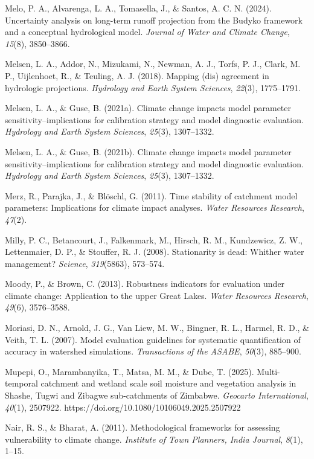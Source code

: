 \documentclass[
]{article}
\begin{document}
Melo, P. A., Alvarenga, L. A., Tomasella, J., \& Santos, A. C. N.
(2024). Uncertainty analysis on long-term runoff projection from the
Budyko framework and a conceptual hydrological model. \emph{Journal of
Water and Climate Change}, \emph{15}(8), 3850--3866.

Melsen, L. A., Addor, N., Mizukami, N., Newman, A. J., Torfs, P. J.,
Clark, M. P., Uijlenhoet, R., \& Teuling, A. J. (2018). Mapping (dis)
agreement in hydrologic projections. \emph{Hydrology and Earth System
Sciences}, \emph{22}(3), 1775--1791.

Melsen, L. A., \& Guse, B. (2021a). Climate change impacts model
parameter sensitivity--implications for calibration strategy and model
diagnostic evaluation. \emph{Hydrology and Earth System Sciences},
\emph{25}(3), 1307--1332.

Melsen, L. A., \& Guse, B. (2021b). Climate change impacts model
parameter sensitivity--implications for calibration strategy and model
diagnostic evaluation. \emph{Hydrology and Earth System Sciences},
\emph{25}(3), 1307--1332.

Merz, R., Parajka, J., \& Blöschl, G. (2011). Time stability of
catchment model parameters: Implications for climate impact analyses.
\emph{Water Resources Research}, \emph{47}(2).

Milly, P. C., Betancourt, J., Falkenmark, M., Hirsch, R. M., Kundzewicz,
Z. W., Lettenmaier, D. P., \& Stouffer, R. J. (2008). Stationarity is
dead: Whither water management? \emph{Science}, \emph{319}(5863),
573--574.

Moody, P., \& Brown, C. (2013). Robustness indicators for evaluation
under climate change: Application to the upper Great Lakes. \emph{Water
Resources Research}, \emph{49}(6), 3576--3588.

Moriasi, D. N., Arnold, J. G., Van Liew, M. W., Bingner, R. L., Harmel,
R. D., \& Veith, T. L. (2007). Model evaluation guidelines for
systematic quantification of accuracy in watershed simulations.
\emph{Transactions of the ASABE}, \emph{50}(3), 885--900.

Mupepi, O., Marambanyika, T., Matsa, M. M., \& Dube, T. (2025).
Multi-temporal catchment and wetland scale soil moisture and vegetation
analysis in Shashe, Tugwi and Zibagwe sub-catchments of Zimbabwe.
\emph{Geocarto International}, \emph{40}(1), 2507922.
https://doi.org/10.1080/10106049.2025.2507922

Nair, R. S., \& Bharat, A. (2011). Methodological frameworks for
assessing vulnerability to climate change. \emph{Institute of Town
Planners, India Journal}, \emph{8}(1), 1--15.
\end{document}
